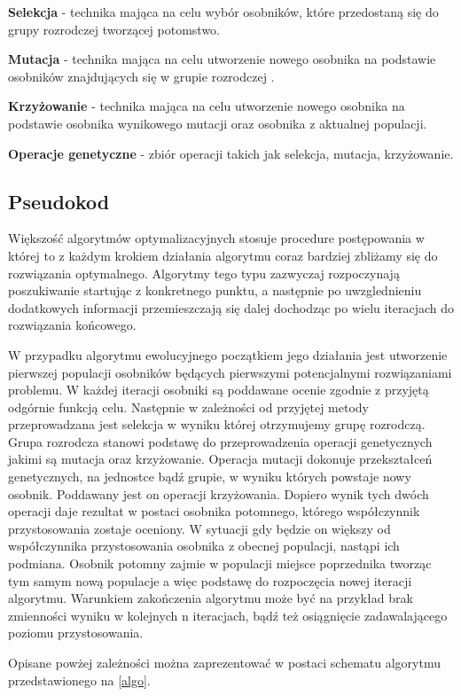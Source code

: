 \textbf{Selekcja} - technika mająca na celu wybór osobników, które przedostaną się do grupy rozrodczej tworzącej potomstwo.

\textbf{Mutacja} - technika mająca na celu utworzenie nowego osobnika na podstawie osobników znajdujących się w grupie rozrodczej .

\textbf{Krzyżowanie} - technika mająca na celu utworzenie nowego osobnika na podstawie osobnika wynikowego mutacji oraz osobnika z aktualnej populacji.

\textbf{Operacje genetyczne} - zbiór operacji takich jak selekcja, mutacja, krzyżowanie.

\subsection{Pseudokod}
\par
 Większość algorytmów optymalizacyjnych stosuje procedure postępowania w której to z każdym krokiem działania algorytmu coraz bardziej zbliżamy się do rozwiązania optymalnego. Algorytmy tego typu zazwyczaj rozpoczynają poszukiwanie startując z konkretnego punktu, a następnie po uwzglednieniu dodatkowych informacji przemieszczają się dalej dochodząc po wielu iteracjach do rozwiązania końcowego.\\
\par
 W przypadku algorytmu ewolucyjnego początkiem jego działania jest utworzenie pierwszej populacji osobników będących pierwszymi potencjalnymi rozwiązaniami problemu. W każdej iteracji osobniki są poddawane ocenie zgodnie z przyjętą odgórnie funkcją celu. Następnie w zależności od przyjętej metody przeprowadzana jest selekcja w wyniku której otrzymujemy grupę rozrodczą. Grupa rozrodcza stanowi podstawę do przeprowadzenia operacji genetycznych jakimi są mutacja oraz krzyżowanie. Operacja mutacji dokonuje przekształceń genetycznych, na jednostce bądź grupie, w wyniku których powstaje nowy osobnik. Poddawany jest on operacji krzyżowania. Dopiero wynik tych dwóch operacji daje rezultat w postaci osobnika potomnego, którego współczynnik przystosowania zostaje oceniony. W sytuacji gdy będzie on większy od współczynnika przystosowania osobnika z obecnej populacji, nastąpi ich podmiana. Osobnik potomny zajmie w populacji miejsce poprzednika tworząc tym samym nową populacje a więc podstawę do rozpoczęcia nowej iteracji algorytmu. Warunkiem zakończenia algorytmu może być na przykład brak zmienności wyniku w kolejnych n iteracjach, bądź też osiągnięcie zadawalającego poziomu przystosowania.\\
\par
Opisane powżej zależności można zaprezentować w postaci schematu algorytmu przedstawionego na \ref{algo}.

